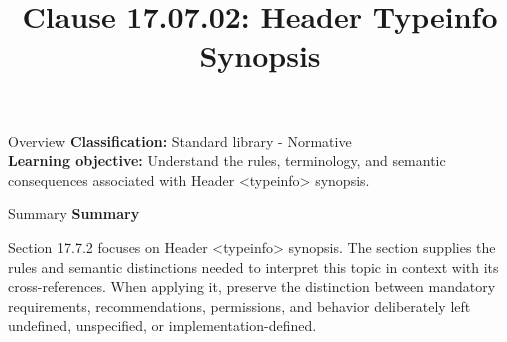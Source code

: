 \documentclass[10pt,letterpaper]{article}
\title{Clause 17.07.02: Header Typeinfo Synopsis}
\author{}
\date{}
\begin{document}
\maketitle
\begin{CornellOverviewBox}{Overview}
\textbf{Classification:} Standard library - Normative\\[2pt]
\textbf{Learning objective:} Understand the rules, terminology, and semantic consequences associated with Header <typeinfo> synopsis.
\end{CornellOverviewBox}\begin{CornellSummaryBox}{Summary}
{\sffamily\bfseries\color{Accent} Summary}\par\vspace{3pt}Section 17.7.2 focuses on Header <typeinfo> synopsis. The section supplies the rules and semantic distinctions needed to interpret this topic in context with its cross-references. When applying it, preserve the distinction between mandatory requirements, recommendations, permissions, and behavior deliberately left undefined, unspecified, or implementation-defined.
\end{CornellSummaryBox}
\end{document}
